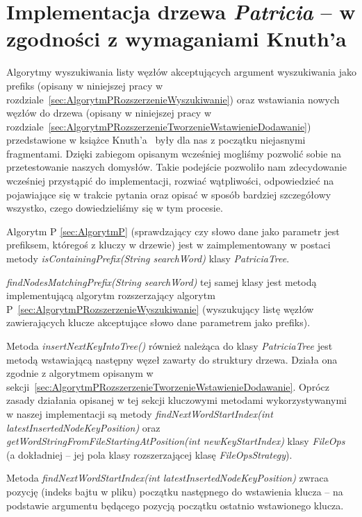 		\section{Implementacja drzewa \emph{Patricia} -- w zgodności z wymaganiami Knuth'a}\label{sec:czescPraktycznaImplementacjaDrzewaPatriciaKnuth}
		
		Algorytmy wyszukiwania listy węzłów akceptujących argument wyszukiwania jako prefiks (opisany w niniejszej pracy w rozdziale~\ref{sec:AlgorytmPRozszerzenieWyszukiwanie}) oraz wstawiania nowych węzłów do drzewa (opisany w niniejszej pracy w rozdziale~\ref{sec:AlgorytmPRozszerzenieTworzenieWstawienieDodawanie}) przedstawione w książce Knuth'a~ \cite{KnuthsTheArtOfComputerProgramming3} były dla nas z początku niejasnymi fragmentami. Dzięki zabiegom opisanym wcześniej mogliśmy pozwolić sobie na przetestowanie naszych domysłów. Takie podejście pozwoliło nam zdecydowanie wcześniej przystąpić do implementacji, rozwiać wątpliwości, odpowiedzieć na pojawiające się w trakcie pytania oraz opisać w sposób bardziej szczegółowy wszystko, czego dowiedzieliśmy się w tym procesie.
		
		Algorytm P \ref{sec:AlgorytmP} (sprawdzający czy słowo dane jako parametr jest prefiksem, któregoś z kluczy w drzewie) jest w zaimplementowany w postaci metody \emph{isContainingPrefix(String searchWord)} klasy \emph{PatriciaTree}. 
		
		\emph{findNodesMatchingPrefix(String searchWord)} tej samej klasy jest metodą implementującą algorytm rozszerzający algorytm P~\ref{sec:AlgorytmPRozszerzenieWyszukiwanie} (wyszukujący listę węzłów zawierających klucze akceptujące słowo dane parametrem jako prefiks). 
		
		Metoda \emph{insertNextKeyIntoTree()} również należąca do klasy \emph{PatriciaTree} jest metodą wstawiającą następny węzeł zawarty do struktury drzewa. Działa ona zgodnie z algorytmem opisanym w sekcji~\ref{sec:AlgorytmPRozszerzenieTworzenieWstawienieDodawanie}. Oprócz zasady działania opisanej w tej sekcji kluczowymi metodami wykorzystywanymi w naszej implementacji są metody \emph{findNextWordStartIndex(int latestInsertedNodeKeyPosition)} oraz \emph{getWordStringFromFileStartingAtPosition(int newKeyStartIndex)} klasy \emph{FileOps} (a dokładniej -- jej pola klasy rozszerzającej klasę \emph{FileOpsStrategy}).
		
		Metoda \emph{findNextWordStartIndex(int latestInsertedNodeKeyPosition)} zwraca pozycję (indeks bajtu w pliku) początku następnego do wstawienia klucza -- na podstawie argumentu będącego pozycją początku ostatnio wstawionego klucza.
		
